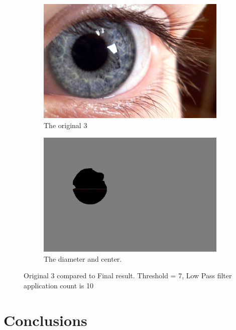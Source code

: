\documentclass{article}
\begin{document}
%
%
\begin{figure}[H]
\centering

\begin{subfigure}{.5\textwidth}
  \centering
  \includegraphics[width=0.9\linewidth]{res/pupil/results/eye4.jpg}
  \caption{The original 3}
  \label{fig:original_img}
\end{subfigure}%
\begin{subfigure}{.5\textwidth}
  \centering
  \includegraphics[width=0.9\linewidth]{res/pupil/results/eye4_pupil.jpg}
  \caption{The diameter and center.}
  \label{fig:gray_img}
\end{subfigure}


\caption{Original 3 compared to Final result. Threshold = 7, Low Pass filter application count is 10}
\label{fig:result_pup_org3_final}
\end{figure}




\section{Conclusions}
\label{sec:conc}
\end{document}
